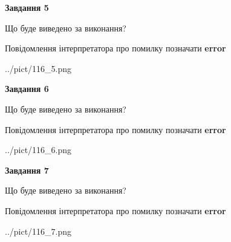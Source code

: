 \documentclass[10pt, ukrainian]{article}
\begin{document}
{\begin {large}
{\begin {center}\textbf{Завдання 5}\end {center}}\par
Що буде виведено за виконання? \par
Повідомлення інтерпретатора про помилку позначати \textbf{error}

\begin{center}
	{../pict/116_5.png}
\end{center}
\newpage

{\begin {center}\textbf{Завдання 6}\end {center}}\par
Що буде виведено за виконання? \par
Повідомлення інтерпретатора про помилку позначати \textbf{error}

\begin{center}
	{../pict/116_6.png}
\end{center}
\newpage

{\begin {center}\textbf{Завдання 7}\end {center}}\par
Що буде виведено за виконання? \par
Повідомлення інтерпретатора про помилку позначати \textbf{error}

\begin{center}
	{../pict/116_7.png}
\end{center}
\newpage

\end {large}}
\end{document}

